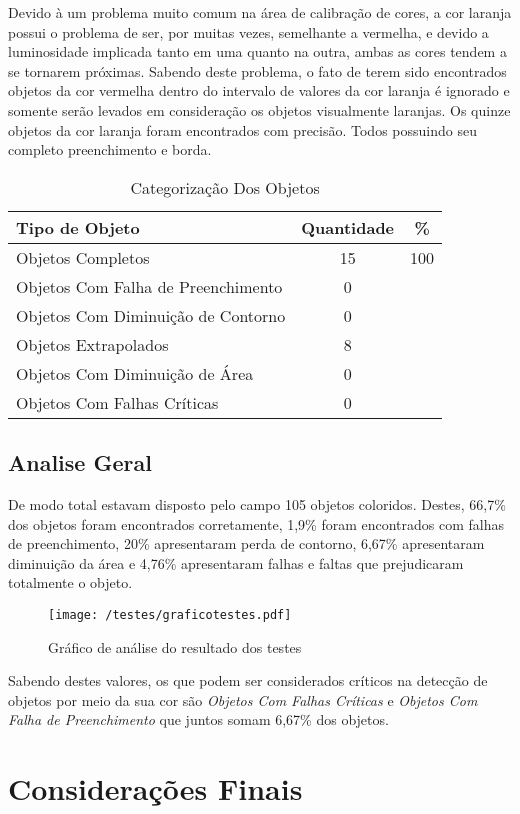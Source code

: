	Devido à um problema muito comum na área de calibração de cores, a cor laranja possui o problema de ser, por muitas vezes, semelhante a vermelha, e devido a luminosidade implicada tanto em uma quanto na outra, ambas as cores tendem a se tornarem próximas.
	Sabendo deste problema, o fato de terem sido encontrados objetos da cor vermelha dentro do intervalo de valores da cor laranja é ignorado e somente serão levados em consideração os objetos visualmente laranjas.
	Os quinze objetos da cor laranja foram encontrados com precisão. Todos possuindo seu completo preenchimento e borda.
	
\begin{table}[h]
\centering
\begin{tabular}{l|c|c}
Tipo de Objeto & Quantidade  & \% \\ %
\hline                               %
Objetos Completos &  15 & 100 \\
\hline 
Objetos Com Falha de Preenchimento & 0 \\
\hline 
Objetos Com Diminuição de Contorno &  0 \\
\hline 
Objetos Extrapolados & 8 \\
\hline 
Objetos Com Diminuição de Área &  0 \\
\hline 
Objetos Com Falhas Críticas & 0 \\
\hline 
\end{tabular}
\caption{Categorização Dos Objetos}
\end{table}
\newpage
\subsection{Analise Geral}
De modo total estavam disposto pelo campo 105 objetos coloridos. Destes, 66,7\% dos objetos foram encontrados corretamente, 1,9\% foram encontrados com falhas de preenchimento, 20\% apresentaram perda de contorno, 6,67\% apresentaram diminuição da área e 4,76\% apresentaram falhas e faltas que prejudicaram totalmente o objeto.
	\begin{figure}[H]
		\centering
		\texttt{[image: /testes/graficotestes.pdf]}
		\caption{Gráfico de análise do resultado dos testes}
		\label{disposicaoparte}
	\end{figure}
	
	
	Sabendo destes valores, os que podem ser considerados críticos na detecção de objetos por meio da sua cor são \textit{Objetos Com Falhas Críticas} e \textit{Objetos Com Falha de Preenchimento} que juntos somam 6,67\% dos objetos.
	
	\section{Considerações Finais}